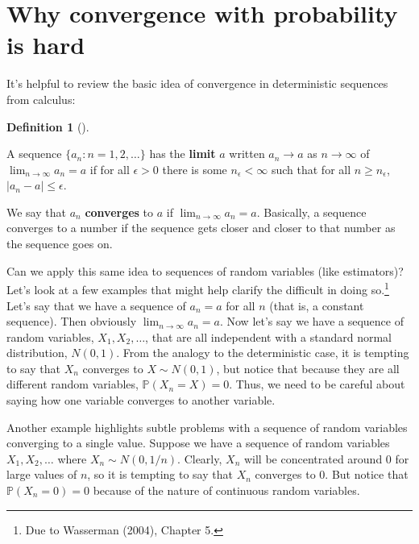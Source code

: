 \documentclass[
  letterpaper,
  DIV=11,
  numbers=noendperiod]{scrreprt}
\renewcommand{\P}{\mathbb{P}}
\theoremstyle{definition}
\newtheorem{definition}{Definition}[chapter]
\theoremstyle{plain}
\theoremstyle{definition}
\theoremstyle{remark}
\begin{document}
\hypertarget{why-convergence-with-probability-is-hard}{%
\section{Why convergence with probability is
hard}\label{why-convergence-with-probability-is-hard}}

It's helpful to review the basic idea of convergence in deterministic
sequences from calculus:

\leavevmode{}%
\begin{definition}[]\label{def-limit}

A sequence \(\{a_n: n = 1, 2, \ldots\}\) has the \textbf{limit} \(a\)
written \(a_n \rightarrow a\) as \(n\rightarrow \infty\) of
\(\lim_{n\rightarrow \infty} a_n = a\) if for all \(\epsilon > 0\) there
is some \(n_{\epsilon} < \infty\) such that for all
\(n \geq n_{\epsilon}\), \(|a_n - a| \leq \epsilon\).

\end{definition}

We say that \(a_n\) \textbf{converges} to \(a\) if
\(\lim_{n\rightarrow\infty} a_n = a\). Basically, a sequence converges
to a number if the sequence gets closer and closer to that number as the
sequence goes on.

Can we apply this same idea to sequences of random variables (like
estimators)? Let's look at a few examples that might help clarify the
difficult in doing so.\footnote{Due to Wasserman (2004), Chapter 5.}
Let's say that we have a sequence of \(a_n = a\) for all \(n\) (that is,
a constant sequence). Then obviously
\(\lim_{n\rightarrow\infty} a_n = a\). Now let's say we have a sequence
of random variables, \(X_1, X_2, \ldots\), that are all independent with
a standard normal distribution, \(N(0,1)\). From the analogy to the
deterministic case, it is tempting to say that \(X_n\) converges to
\(X \sim N(0, 1)\), but notice that because they are all different
random variables, \(\P(X_n = X) = 0\). Thus, we need to be careful about
saying how one variable converges to another variable.

Another example highlights subtle problems with a sequence of random
variables converging to a single value. Suppose we have a sequence of
random variables \(X_1, X_2, \ldots\) where \(X_n \sim N(0, 1/n)\).
Clearly, \(X_n\) will be concentrated around 0 for large values of
\(n\), so it is tempting to say that \(X_n\) converges to 0. But notice
that \(\P(X_n = 0) = 0\) because of the nature of continuous random
variables.
\end{document}
